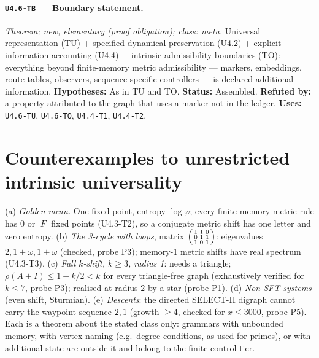 \documentclass[11pt]{article}
\begin{document}
\paragraph{\texttt{U4.6-TB} --- Boundary statement.} \emph{Theorem; new, elementary (proof obligation); class: meta.} Universal representation (TU) + specified dynamical preservation (U4.2) + explicit information accounting (U4.4) + intrinsic admissibility boundaries (TO): everything beyond finite-memory metric admissibility --- markers, embeddings, route tables, observers, sequence-specific controllers --- is declared additional information. \textbf{Hypotheses:} As in TU and TO. \textbf{Status:} Assembled. \textbf{Refuted by:} a property attributed to the graph that uses a marker not in the ledger. \textbf{Uses:} \texttt{U4.6-TU}, \texttt{U4.6-TO}, \texttt{U4.4-T1}, \texttt{U4.4-T2}.


\section{Counterexamples to unrestricted intrinsic universality}\label{sec:counter}
(a) \emph{Golden mean.} One fixed point, entropy $\log\varphi$; every finite-memory metric rule has $0$ or $|F|$ fixed points (U4.3-T2), so a conjugate metric shift has one letter and zero entropy. (b) \emph{The 3-cycle with loops}, matrix $\begin{psmallmatrix}1&1&0\\0&1&1\\1&0&1\end{psmallmatrix}$: eigenvalues $2,1+\omega,1+\bar\omega$ (checked, probe P3); memory-1 metric shifts have real spectrum (U4.3-T3). (c) \emph{Full $k$-shift, $k\ge3$, radius 1}: needs a triangle; $\rho(A+I)\le1+k/2<k$ for every triangle-free graph (exhaustively verified for $k\le7$, probe P3); realised at radius $2$ by a star (probe P1). (d) \emph{Non-SFT systems} (even shift, Sturmian). (e) \emph{Descents}: the directed SELECT-II digraph cannot carry the waypoint sequence $2,1$ (growth $\ge4$, checked for $x\le3000$, probe P5). Each is a theorem about the stated class only: grammars with unbounded memory, with vertex-naming (e.g.\ degree conditions, as used for primes), or with additional state are outside it and belong to the finite-control tier.
\end{document}
